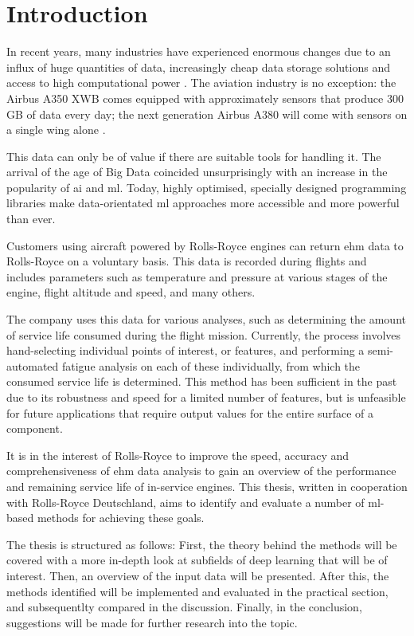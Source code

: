 \section{Introduction}
In recent years, many industries have experienced enormous changes due to an influx of huge quantities of data, increasingly cheap data storage solutions and access to high computational power \cite{chen_big_2014}. The aviation industry is no exception: the Airbus A350 XWB comes equipped with approximately  sensors that produce 300 GB of data every day; the next generation Airbus A380 will come with  sensors on a single wing alone \cite[]{rajaraman_big_2016}.

This data can only be of value if there are suitable tools for handling it. The arrival of the age of Big Data \cite[]{fan_mining_2013} coincided unsurprisingly with an increase in the popularity of \ac{ai} and \ac{ml}. Today, highly optimised, specially designed programming libraries make data-orientated \ac{ml} approaches more accessible and more powerful than ever.

Customers using aircraft powered by Rolls-Royce engines can return \ac{ehm} data to Rolls-Royce on a voluntary basis. This data is recorded during flights and includes parameters such as temperature and pressure at various stages of the engine, flight altitude and speed, and many others.

The company uses this data for various analyses, such as determining the amount of service life consumed during the flight mission. Currently, the process involves hand-selecting individual points of interest, or features, and performing a semi-automated fatigue analysis on each of these individually, from which the consumed service life is determined. This method has been sufficient in the past due to its robustness and speed for a limited number of features, but is unfeasible for future applications that require output values for the entire surface of a component.

It is in the interest of Rolls-Royce to improve the speed, accuracy and comprehensiveness of \ac{ehm} data analysis to gain an overview of the performance and remaining service life of in-service engines. This thesis, written in cooperation with Rolls-Royce Deutschland, aims to identify and evaluate a number of \ac{ml}-based methods for achieving these goals.

The thesis is structured as follows: First, the theory behind the methods will be covered with a more in-depth look at subfields of deep learning that will be of interest. Then, an overview of the input data will be presented. After this, the methods identified will be implemented and evaluated in the practical section, and subsequentlty compared in the discussion. Finally, in the conclusion, suggestions will be made for further research into the topic.